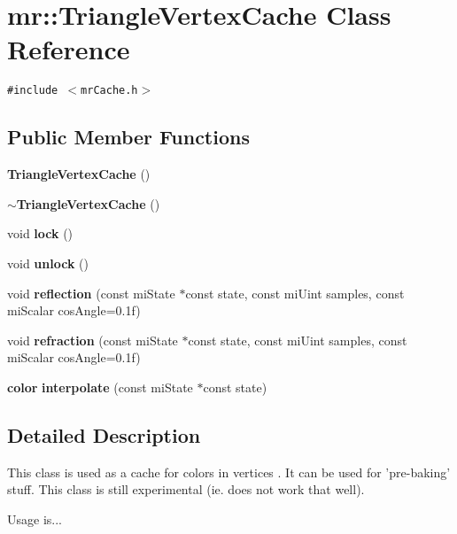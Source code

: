 \section{mr::Triangle\-Vertex\-Cache Class Reference}
\label{classmr_1_1TriangleVertexCache}
{\tt \#include $<$mr\-Cache.h$>$}

\subsection*{Public Member Functions}
\begin{CompactItemize}
\item 
{\bf Triangle\-Vertex\-Cache} ()
\item 
{\bf $\sim$Triangle\-Vertex\-Cache} ()
\item 
void {\bf lock} ()
\item 
void {\bf unlock} ()
\item 
void {\bf reflection} (const mi\-State $\ast$const state, const mi\-Uint samples, const mi\-Scalar cos\-Angle=0.1f)
\item 
void {\bf refraction} (const mi\-State $\ast$const state, const mi\-Uint samples, const mi\-Scalar cos\-Angle=0.1f)
\item 
{\bf color} {\bf interpolate} (const mi\-State $\ast$const state)
\end{CompactItemize}


\subsection{Detailed Description}
This class is used as a cache for colors in vertices . It can be used for 'pre-baking' stuff. This class is still experimental (ie. does not work that well).

Usage is...



